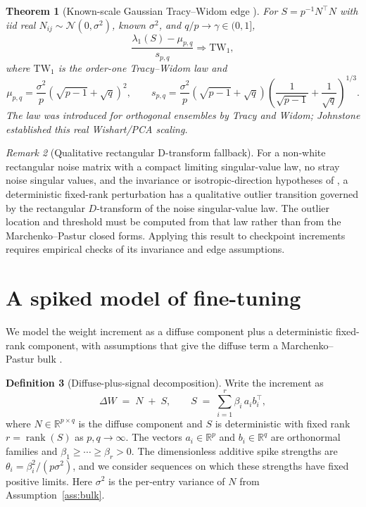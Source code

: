 \documentclass[11pt]{article}
\newtheorem{theorem}{Theorem}[section]
\theoremstyle{definition}
\newtheorem{definition}[theorem]{Definition}
\theoremstyle{remark}
\newtheorem{remark}[theorem]{Remark}
\newcommand{\R}{\mathbb{R}}
\DeclareMathOperator{\rank}{rank}
\newcommand{\dW}{\Delta W}
\newcommand{\TW}{\mathrm{TW}}
\begin{document}
\begin{theorem}[Known-scale Gaussian Tracy--Widom edge
\cite{tracywidom1996,johnstone2001}]
\label{thm:tw}
For $S=p^{-1}N^{\!\top}N$ with iid real
$N_{ij}\sim\mathcal N(0,\sigma^2)$, known $\sigma^2$, and
$q/p\to\gamma\in(0,1]$,
\[
  \frac{\lambda_1(S)-\mu_{p,q}}{s_{p,q}}\Rightarrow\TW_1,
\]
where $\TW_1$ is the order-one Tracy--Widom law and
\[
  \mu_{p,q}=\frac{\sigma^2}{p}(\sqrt{p-1}+\sqrt q)^2,
  \qquad
  s_{p,q}=\frac{\sigma^2}{p}(\sqrt{p-1}+\sqrt q)
  \left(\frac1{\sqrt{p-1}}+\frac1{\sqrt q}\right)^{1/3}.
\]
The law was introduced for orthogonal ensembles by Tracy and Widom; Johnstone
established this real Wishart/PCA scaling.
\end{theorem}

\begin{remark}[Qualitative rectangular D-transform fallback]
\label{rem:rectangular-general}
For a non-white rectangular noise matrix with a compact limiting singular-value
law, no stray noise singular values, and the invariance or isotropic-direction
hypotheses of \cite{benaych2012}, a deterministic fixed-rank perturbation has a
qualitative outlier transition governed by the rectangular $D$-transform of the
noise singular-value law. The outlier location and threshold must be computed
from that law rather than from the Marchenko--Pastur closed forms. Applying this
result to checkpoint increments requires empirical checks of its invariance and
edge assumptions.
\end{remark}

\section{A spiked model of fine-tuning}
\label{sec:model}

We model the weight increment as a diffuse component plus a deterministic fixed-rank
component, with assumptions that give the diffuse term a Marchenko--Pastur bulk
\cite{marchenko1967}.

\begin{definition}[Diffuse-plus-signal decomposition]
\label{def:decomp}
Write the increment as
\[
  \dW \;=\; N \;+\; S, \qquad
  S \;=\; \sum_{i=1}^{r} \beta_i\, a_i b_i^{\!\top},
\]
where $N \in \R^{p\times q}$ is the diffuse component and $S$ is deterministic
with fixed rank $r=\rank(S)$ as $p,q\to\infty$. The vectors
$a_i\in\R^p$ and $b_i\in\R^q$ are orthonormal families and
$\beta_1\ge\cdots\ge\beta_r>0$. The dimensionless additive spike strengths are
$\theta_i=\beta_i^2/(p\sigma^2)$, and we consider sequences on which these
strengths have fixed positive limits. Here $\sigma^2$ is the per-entry variance
of $N$ from Assumption~\ref{ass:bulk}.
\end{definition}
\end{document}
